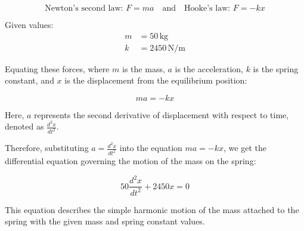 \documentclass[journal,12pt,twocolumn]{IEEEtran}
\theoremstyle{remark}
\begin{document}
\begin{equation}
    \text{Newton's second law: } F = ma \quad \text{and} \quad \text{Hooke's law: } F = -kx
\end{equation}

Given values:
\begin{align*}
    m &= 50 \, \text{kg} \\
    k &= 2450 \, \text{N/m}
\end{align*}

Equating these forces, where $m$ is the mass, $a$ is the acceleration, $k$ is the spring constant, and $x$ is the displacement from the equilibrium position:

\begin{equation}
    ma = -kx
\end{equation}

Here, $a$ represents the second derivative of displacement with respect to time, denoted as $\frac{d^2x}{dt^2}$.

Therefore, substituting $a = \frac{d^2x}{dt^2}$ into the equation $ma = -kx$, we get the differential equation governing the motion of the mass on the spring:

\begin{equation}
    50 \frac{d^2x}{dt^2} + 2450x = 0
\end{equation}

This equation describes the simple harmonic motion of the mass attached to the spring with the given mass and spring constant values.	
\end{document}

